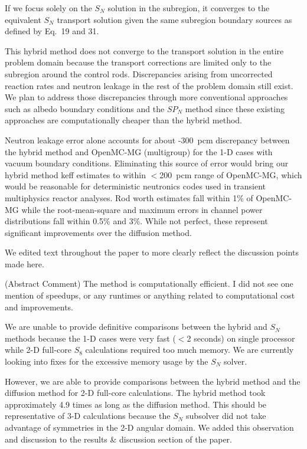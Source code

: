 \documentclass[answers,11pt]{exam}
\begin{document}
\begin{questions}
\begin{solution}
        If we focus solely on the $S_N$ solution in the subregion, it converges to the equivalent
        $S_N$ transport solution given the same subregion boundary sources as defined by Eq.\ 19
        and 31.

        This hybrid method does not converge to the transport solution in the entire problem domain
        because the transport
        corrections are limited only to the subregion around the control rods. Discrepancies
        arising from uncorrected reaction rates and neutron leakage in the rest of the problem
        domain still exist. We plan to address those discrepancies through more conventional
        approaches such as albedo boundary conditions and the $SP_N$ method since these
        existing approaches are computationally cheaper than the hybrid method.

        Neutron leakage error alone accounts for about -300~pcm
        discrepancy between the hybrid method and OpenMC-MG (multigroup) for the 1-D cases with vacuum
        boundary conditions. Eliminating this source of error would bring our hybrid method keff
        estimates to within $<$200~pcm range of OpenMC-MG, which would be reasonable for
        deterministic neutronics codes used in transient multiphysics reactor analyses. Rod worth
        estimates fall within 1\% of OpenMC-MG while the root-mean-square and maximum errors in
        channel power distributions fall within 0.5\% and 3\%. While not perfect, these represent
        significant improvements over the diffusion method.

        We edited text throughout the paper to more clearly
        reflect the discussion points made here.
    \end{solution}

    \question (Abstract Comment) The method is computationally efficient. I did not see one mention of speedups, or any runtimes or anything related to computational cost and improvements.
    \begin{solution}
        We are unable to provide definitive comparisons between the hybrid and $S_N$ methods because the 1-D
        cases were very fast ($<$2 seconds) on single processor while 2-D full-core $S_8$
        calculations required too much memory. We are currently looking into fixes for the excessive
        memory usage by the $S_N$ solver.

        However, we are able to provide comparisons between the hybrid method and the diffusion
        method for 2-D full-core calculations.
        The hybrid method took approximately 4.9 times as long as the diffusion method. This should
        be representative of 3-D calculations because the $S_N$ subsolver did not take advantage of
        symmetries in the 2-D angular domain. We added this observation and discussion to the
        results \& discussion section of the paper.
    \end{solution}


\end{questions}
\end{document}
